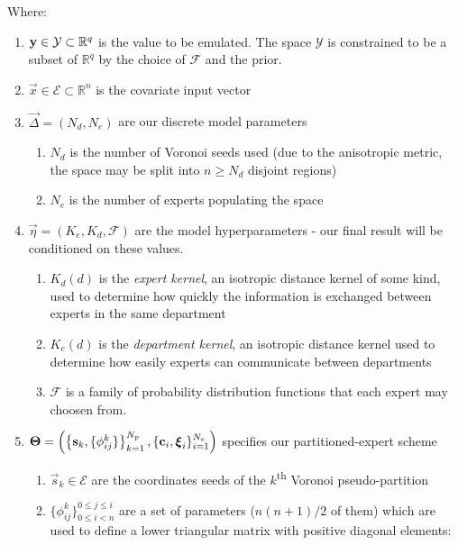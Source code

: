 \begin{table}
			\begin{flushleft}
				\small  Where:
				\begin{enumerate}
					\item $\mathbf{\boldsymbol{\mathrm{y}}} \in \mathcal{Y} \subset \mathbb{R}^q$ is the value to be emulated. The space $\mathcal{Y}$ is constrained to be a subset of $\mathbb{R}^q$ by the choice of $\mathcal{F}$ and the prior.
					\item $\vec{x} \in \mathcal{E} \subset \mathbb{R}^n$ is the covariate input vector
					\item $\vec{\Delta} = (N_d,N_e)$ are our discrete model parameters
					      \begin{enumerate}
						      \item $N_d$ is the number of Voronoi seeds used (due to the anisotropic metric, the space may be split into $n \geq N_d$ disjoint regions)
						      \item $N_e$ is the number of experts populating the space
					      \end{enumerate}
					\item $\vec{\eta}= (K_e,K_d,\mathcal{F})$ are the model hyperparameters - our final result will be conditioned on these values.
					      \begin{enumerate}
						      \item $K_d(d)$ is the \textit{expert kernel}, an isotropic distance kernel of some kind, used to determine how quickly the information is exchanged between experts in the same department
						      \item $K_e(d)$ is the \textit{department kernel}, an isotropic distance kernel used to determine how easily experts can communicate between departments
						      \item $\mathcal{F}$ is a family of probability distribution functions that each expert may choosen from.
					      \end{enumerate}
					\item $\mathbf{\boldsymbol{\mathrm{\Theta}}} = \left(\left\{\mathbf{\boldsymbol{\mathrm{s}}}_k,\{\phi^k_{ij}\}\right\}_{k=1}^{N_{p}},\{\mathbf{\boldsymbol{\mathrm{c}}}_i, \mathbf{\boldsymbol{\mathrm{\xi}}}_i\}_{i=1}^{N_e}\right)$ specifies our partitioned-expert scheme
					      \begin{enumerate}
						      \item $\vec{s}_k \in \mathcal{E}$ are the coordinates seeds of the $k$\textsuperscript{th} Voronoi pseudo-partition
						      \item $\{\phi^k_{ij}\}_{0 \leq i < n}^{0 \leq j \leq i}$ are a set of parameters ($n(n+1)/2$ of them) which are used to define a lower triangular matrix with positive diagonal elements:

\end{enumerate}
\end{enumerate}
\end{flushleft}
\end{table}

